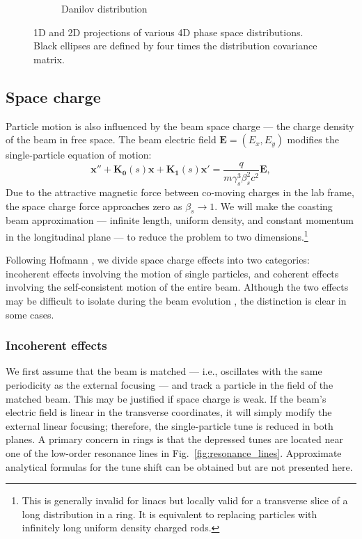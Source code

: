 \begin{figure}[!p]
\begin{subfigure}{0.49\textwidth}
        \caption{Danilov distribution}
        \label{fig:distributions_danilov}
    \end{subfigure}
    \caption{1D and 2D projections of various 4D phase space distributions. Black ellipses are defined by four times the distribution covariance matrix.}
    \label{fig:distributions}
\end{figure}
%






\subsection{Space charge}\label{sec:Space charge}

Particle motion is also influenced by the beam space charge — the charge density of the beam in free space. The beam electric field $\mathbf{E} = (E_x, E_y)$ modifies the single-particle equation of motion:
%
\begin{equation}\label{eq:eom_with_spacecharge}
    \mathbf{x}'' + \mathbf{K_0}(s) \mathbf{x} + \mathbf{K_1}(s) \mathbf{x}' = \frac{q}{m\gamma_s^3\beta_s^2c^2} \mathbf{E},
\end{equation}
% 
Due to the attractive magnetic force between co-moving charges in the lab frame, the space charge force approaches zero as $\beta_s \rightarrow 1$. We will make the coasting beam approximation — infinite length, uniform density, and constant momentum in the longitudinal plane — to reduce the problem to two dimensions.\footnote{This is generally invalid for linacs but locally valid for a transverse slice of a long distribution in a ring. It is equivalent to replacing particles with infinitely long uniform density charged rods.}

Following Hofmann \cite{Hofmann2017Book}, we divide space charge effects into two categories: incoherent effects involving the motion of single particles, and coherent effects involving the self-consistent motion of the entire beam. Although the two effects may be difficult to isolate during the beam evolution \cite{Hofmann2021}, the distinction is clear in some cases. 


\subsubsection{Incoherent effects}

We first assume that the beam is matched — i.e., oscillates with the same periodicity as the external focusing — and track a particle in the field of the matched beam. This may be justified if space charge is weak. If the beam's electric field is linear in the transverse coordinates, it will simply modify the external linear focusing; therefore, the single-particle tune is reduced in both planes. A primary concern in rings is that the depressed tunes are located near one of the low-order resonance lines in Fig.~\ref{fig:resonance_lines}. Approximate analytical formulas for the tune shift can be obtained \cite{Ng2005} but are not presented here.

